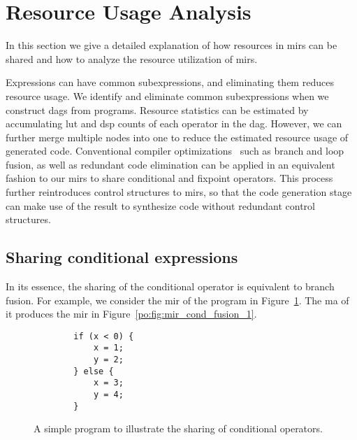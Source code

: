 \section{Resource Usage Analysis}
\label{po:sec:resource}

In this section we give a detailed explanation of how resources in \glspl{mir}
can be shared and how to analyze the resource utilization of \glspl{mir}.

Expressions can have common subexpressions, and eliminating them reduces
resource usage.  We identify and eliminate common subexpressions when we
construct \glspl{dag} from programs.  Resource statistics can be estimated
by accumulating \gls{lut} and \gls{dsp} counts of each operator in the
\gls{dag}\@.  However, we can further merge multiple nodes into one to reduce
the estimated resource usage of generated code.  Conventional compiler
optimizations~\cite{kuck81} such as branch and loop fusion, as well as
redundant code elimination can be applied in an equivalent fashion to our
\glspl{mir} to share conditional and fixpoint operators.  This process further
reintroduces control structures to \glspl{mir}, so that the code generation
stage can make use of the result to synthesize code without redundant control
structures.


\subsection{Sharing conditional expressions}

In its essence, the sharing of the conditional operator is equivalent to
branch fusion.  For example, we consider the \gls{mir} of the program in
Figure~\ref{po:lst:branch_example}.  The \gls{ma} of it produces the \gls{mir}
in Figure~\ref{po:fig:mir_cond_fusion_1}.

\begin{figure}[ht]
    \centering
    \begin{lstlisting}
        if (x < 0) {
            x = 1;
            y = 2;
        } else {
            x = 3;
            y = 4;
        }
    \end{lstlisting}
    \caption{%
        A simple program to illustrate the sharing of conditional operators.
    }\label{po:lst:branch_example}
\end{figure}

